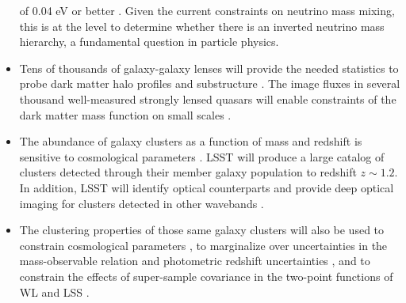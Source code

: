 \begin{itemize}
of 0.04 eV or better
\citep{1999A&A...348...31C,2004PhRvD..70f3510S,2006JCAP...06..025H}.
Given the current constraints on neutrino mass mixing, this is at the
level to determine whether there is an inverted neutrino mass hierarchy, a
fundamental question in particle physics.
\item Tens of thousands of galaxy-galaxy lenses will provide the needed statistics to probe dark matter
halo profiles and substructure \cite[e.g.,][]{2006MNRAS.368..715M,2012Natur.481..341V}. The image fluxes in several thousand well-measured
strongly lensed quasars will enable constraints of the dark matter mass function on small scales \citep{2002ApJ...572...25D}.
\item The abundance of galaxy clusters as a function of mass and redshift is sensitive to cosmological parameters
\citep[SciBook, Ch.~13;][]{2014MNRAS.443.1973V}. LSST will produce a large catalog of clusters detected through their member galaxy population
to redshift $z\sim 1.2$.  In addition, LSST will identify optical counterparts and provide deep optical
imaging for clusters detected in other wavebands \citep[e.g.,][]{2009ApJ...701...32S}.
\item The clustering properties of those same galaxy clusters will also be used to constrain
  cosmological parameters \citep{1996MNRAS.282.1096M,2013MNRAS.434..684M}, to marginalize over uncertainties in
  the mass-observable relation and photometric redshift uncertainties \citep{2011PhRvD..83b3008O}, and to constrain the effects of super-sample covariance in the two-point functions of WL and LSS \citep{2003ApJ...584..702H,2014MNRAS.441.2456T}.

\end{itemize}
